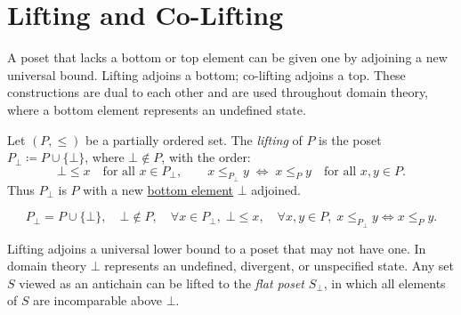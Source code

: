 
\section{Lifting and Co-Lifting}
\label{sec:lifting}

\begin{tcolorbox}[
  colback=gray!6,
  colframe=gray!40,
  arc=2pt,
  left=8pt, right=8pt, top=6pt, bottom=6pt,
  title={\small\textbf{Toolkit: Lifting and Co-Lifting}},
  fonttitle=\small\bfseries
]
A poset that lacks a bottom or top element can be given one by adjoining
a new universal bound.  Lifting adjoins a bottom; co-lifting adjoins a
top.  These constructions are dual to each other and are used throughout
domain theory, where a bottom element represents an undefined state.
\end{tcolorbox}


\begin{tcolorbox}[colback=defbox, colframe=defborder, arc=2pt,
  left=6pt, right=6pt, top=4pt, bottom=4pt,
  title={\small\textbf{Definition (Lifting)}},
  fonttitle=\small\bfseries]
\begin{definition}[Lifting]
\label{def:lifting}
Let $(P, \leq)$ be a partially ordered set.  The \emph{lifting} of $P$
is the poset $P_{\bot} \coloneqq P \cup \{\bot\}$, where $\bot \notin P$,
with the order:
\[
\bot \leq x \quad \text{for all } x \in P_{\bot},
\qquad
x \leq_{P_{\bot}} y \;\Longleftrightarrow\; x \leq_P y
\quad \text{for all } x, y \in P.
\]
Thus $P_{\bot}$ is $P$ with a new
\hyperref[def:bottom-element]{bottom element} $\bot$ adjoined.
\end{definition}
\end{tcolorbox}

\begin{remark*}
\[
P_{\bot} = P \cup \{\bot\},\quad
\bot \notin P,\quad
\forall x \in P_{\bot},\; \bot \leq x,\quad
\forall x,y \in P,\; x \leq_{P_\bot} y \Leftrightarrow x \leq_P y.
\]
\end{remark*}

\begin{remark*}[Interpretation]
Lifting adjoins a universal lower bound to a poset that may not have one.
In domain theory $\bot$ represents an undefined, divergent, or
unspecified state.  Any set $S$ viewed as an antichain can be lifted to
the \emph{flat poset} $S_{\bot}$, in which all elements of $S$ are
incomparable above $\bot$.
\end{remark*}

